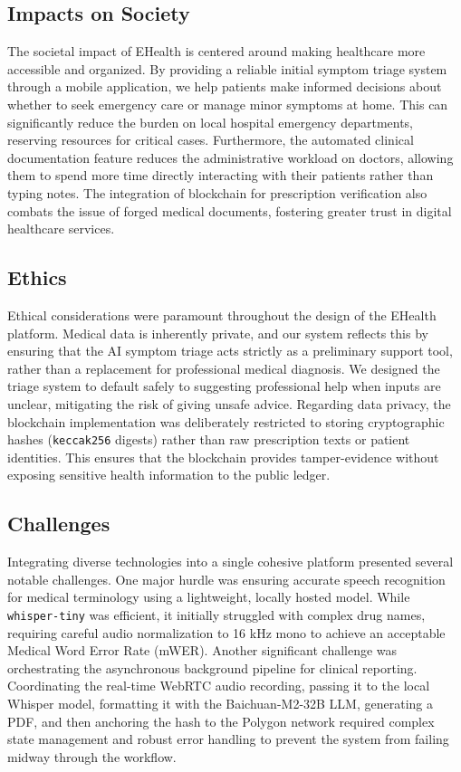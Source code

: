 \subsection{Impacts on Society}
The societal impact of EHealth is centered around making healthcare more accessible and organized. By providing a reliable initial symptom triage system through a mobile application, we help patients make informed decisions about whether to seek emergency care or manage minor symptoms at home. This can significantly reduce the burden on local hospital emergency departments, reserving resources for critical cases. Furthermore, the automated clinical documentation feature reduces the administrative workload on doctors, allowing them to spend more time directly interacting with their patients rather than typing notes. The integration of blockchain for prescription verification also combats the issue of forged medical documents, fostering greater trust in digital healthcare services.

\subsection{Ethics}
Ethical considerations were paramount throughout the design of the EHealth platform. Medical data is inherently private, and our system reflects this by ensuring that the AI symptom triage acts strictly as a preliminary support tool, rather than a replacement for professional medical diagnosis. We designed the triage system to default safely to suggesting professional help when inputs are unclear, mitigating the risk of giving unsafe advice. Regarding data privacy, the blockchain implementation was deliberately restricted to storing cryptographic hashes (\texttt{keccak256} digests) rather than raw prescription texts or patient identities. This ensures that the blockchain provides tamper-evidence without exposing sensitive health information to the public ledger.

\subsection{Challenges}
Integrating diverse technologies into a single cohesive platform presented several notable challenges. One major hurdle was ensuring accurate speech recognition for medical terminology using a lightweight, locally hosted model. While \texttt{whisper-tiny} was efficient, it initially struggled with complex drug names, requiring careful audio normalization to 16 kHz mono to achieve an acceptable Medical Word Error Rate (mWER). Another significant challenge was orchestrating the asynchronous background pipeline for clinical reporting. Coordinating the real-time WebRTC audio recording, passing it to the local Whisper model, formatting it with the Baichuan-M2-32B LLM, generating a PDF, and then anchoring the hash to the Polygon network required complex state management and robust error handling to prevent the system from failing midway through the workflow.

